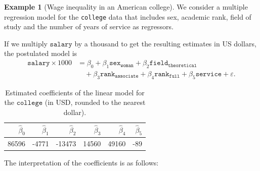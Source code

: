 \documentclass[
  11pt,
  letterpaper,
]{book}
\theoremstyle{definition}
\theoremstyle{definition}
\newtheorem{example}{Example}[chapter]
\theoremstyle{definition}
\theoremstyle{definition}
\theoremstyle{remark}
\begin{document}
\begin{example}[Wage inequality in an American college]
\protect\hypertarget{exm:inequite-salariale}{}{\label{exm:inequite-salariale} {} }We consider a multiple regression model for the \texttt{college} data that includes sex, academic rank, field of study and the number of years of service as regressors.
\end{example}

If we multiply \(\texttt{salary}\) by a thousand to get the resulting estimates in US dollars, the postulated model is
\begin{align*}
\texttt{salary}\times 1000 &= \beta_0 + \beta_1 \texttt{sex}_{\texttt{woman}} +\beta_2 \texttt{field}_{\texttt{theoretical}} \\&\quad +\beta_3 \texttt{rank}_{\texttt{associate}}
+\beta_4 \texttt{rank}_{\texttt{full}}  +\beta_5 \texttt{service} + \varepsilon.
\end{align*}

\begin{table}

\caption{\label{tab:collegecoefs}Estimated coefficients of the linear model for the $\texttt{college}$ (in USD, rounded to the nearest dollar).}
\centering
\begin{tabular}[t]{rrrrrr}
\toprule
$\widehat{\beta}_0$ & $\widehat{\beta}_1$ & $\widehat{\beta}_2$ & $\widehat{\beta}_3$ & $\widehat{\beta}_4$ & $\widehat{\beta}_5$\\
\midrule
86596 & -4771 & -13473 & 14560 & 49160 & -89\\
\bottomrule
\end{tabular}
\end{table}

The interpretation of the coefficients is as follows:
\end{document}
